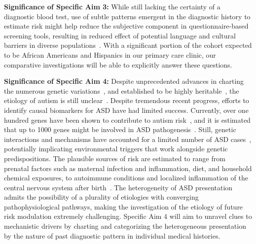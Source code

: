 \documentclass[onecolumn, compsoc,11pt]{IEEEtran}
\begin{document}
\textbf{Significance of Specific Aim 3:} While still lacking the certainty of a diagnostic blood test,  use of subtle patterns emergent in  the diagnostic history to estimate risk might help reduce the subjective component in questionnaire-based screening tools, resulting in reduced effect of potential language and cultural barriers in diverse populations~\cite{hyman2020identification}. With a significant portion of the  cohort expected to be African Americans and Hispanics in our primary care clinic, our comparative investigations will be able to explicitly answer these questions.

\textbf{Significance of Specific Aim 4:} 
Despite unprecedented  advances in charting the numerous genetic variations~\cite{Satterstrom484113}, and established to be highly heritable~\cite{sandin17}, the etiology of autism is still unclear~\cite{pmid29691724,pmid29307081}.
Despite tremendous recent progress, efforts to  identify  causal biomarkers for ASD have had limited success. Currently,  over one hundred genes have been shown to contribute to autism risk~\cite{pmid26402605,pmid25038753,Satterstrom484113}, and it is  estimated that up to 1000 genes might be involved in ASD pathogenesis~\cite{pmid27891212}. Still, genetic interactions and mechanisms have accounted for a limited number of ASD cases~\cite{pmid18414403}, potentially implicating   environmental triggers that  work alongside genetic predispositions. The plausible sources of  risk are estimated to range from prenatal  factors such as maternal infection and inflammation, diet, and  household chemical exposures,  to autoimmune conditions and localized inflammation of the central nervous system after birth~\cite{pmid30971960,pmid30941018,pmid29691724,pmid29307081,pmid27351598,pmid26793298,pmid30095240,pmid25681541}. The heterogeneity of ASD presentation  admits the possibility of a plurality of   etiologies with converging pathophysiological pathways, making the investigation of the etiology of future risk modulation extremely challenging. Specific Aim 4 will aim to unravel clues to mechanistic drivers by charting and categorizing the heterogeneous presentation by the nature of past diagnostic pattern in individual medical histories.
\end{document}
